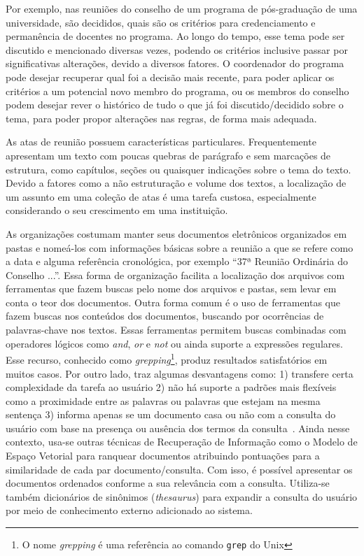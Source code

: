 Por exemplo, nas reuniões do conselho de um programa de pós-graduação de uma universidade, são decididos, quais são os critérios para credenciamento e permanência de docentes no programa. Ao longo do tempo, esse tema pode ser discutido e mencionado diversas vezes, podendo os critérios inclusive passar por significativas alterações, devido a diversos fatores. O coordenador do programa pode desejar recuperar qual foi a decisão mais recente, para poder aplicar os critérios a um potencial novo membro do programa, ou os membros do conselho podem desejar rever o histórico de tudo o que já foi discutido/decidido sobre o tema, para poder propor alterações nas regras, de forma mais adequada.

As atas de reunião possuem características particulares. Frequentemente apresentam um texto com poucas quebras de parágrafo e sem marcações de estrutura, como capítulos, seções ou quaisquer indicações sobre o tema do texto. Devido a fatores como a não estruturação e volume dos textos, a localização de um assunto em uma coleção de atas é uma tarefa custosa, especialmente considerando o seu crescimento em uma instituição. 


As organizações costumam manter seus documentos eletrônicos organizados em pastas e nomeá-los com informações básicas sobre a reunião a que se refere como a data e alguma referência cronológica, por exemplo ``37ª Reunião Ordinária do Conselho ...''. Essa forma de organização facilita a localização dos arquivos com ferramentas que fazem buscas pelo nome dos arquivos e pastas, sem levar em conta o teor dos documentos. 
%
Outra forma comum é o uso de ferramentas que fazem buscas nos conteúdos dos documentos, buscando por ocorrências de palavras-chave nos textos. Essas ferramentas permitem buscas combinadas com operadores lógicos como \textit{and}, \textit{or} e \textit{not} ou ainda suporte a expressões regulares. Esse recurso, conhecido como \textit{grepping}\footnote{O nome \textit{grepping} é uma referência ao comando \texttt{grep} do Unix}, produz resultados satisfatórios em muitos casos. Por outro lado, traz algumas desvantagens como: 
1) transfere certa complexidade da tarefa ao usuário 
2) não há suporte a padrões mais flexíveis como a proximidade entre as palavras ou palavras que estejam na mesma sentença 
3) informa apenas se um documento casa ou não com a consulta do usuário com base na presença ou ausência dos termos da consulta~\cite{Aggarwal2012,Manning2008}. 
% 
Ainda nesse contexto, usa-se outras técnicas de Recuperação de Informação como o Modelo de Espaço Vetorial para ranquear documentos atribuindo pontuações para a similaridade de cada par documento/consulta. Com isso, é possível apresentar os documentos ordenados conforme a sua relevância com a consulta. Utiliza-se também dicionários de sinônimos (\textit{thesaurus}) para expandir a consulta do usuário por meio de conhecimento externo adicionado ao sistema. 

